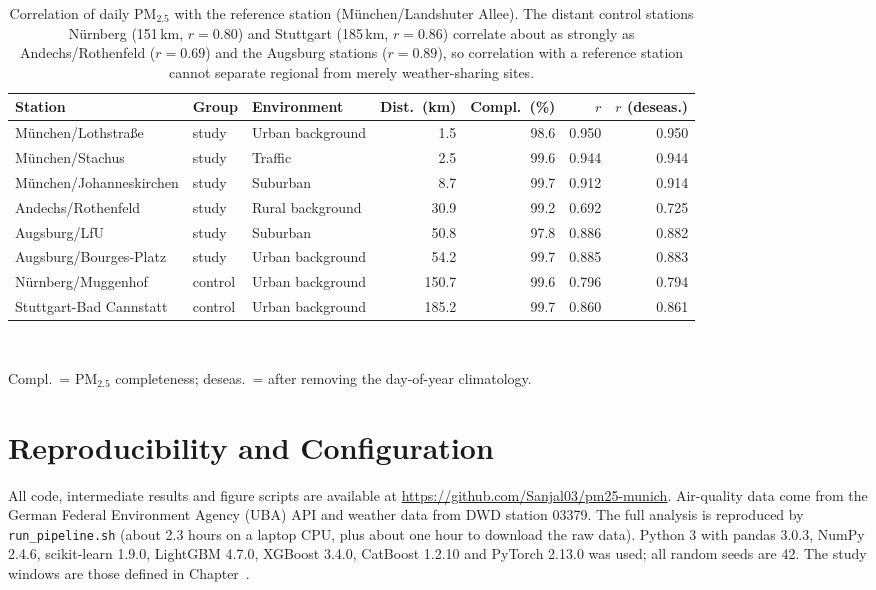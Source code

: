 \begin{table}[!htbp]
\centering\footnotesize\setlength{\tabcolsep}{4pt}
\caption{Correlation of daily PM$_{2.5}$ with the reference station (M\"unchen/Landshuter Allee). The distant control stations N\"urnberg (151\,km, $r=0.80$) and Stuttgart (185\,km, $r=0.86$) correlate about as strongly as Andechs/Rothenfeld ($r=0.69$) and the Augsburg stations ($r=0.89$), so correlation with a reference station cannot separate regional from merely weather-sharing sites.}
\label{tab:app-control}
\begin{tabular}{lllrrrr}
\toprule
Station & Group & Environment & Dist.\ (km) & Compl.\ (\%) & $r$ & $r$ (deseas.) \\
\midrule
M\"unchen/Lothstra{\ss}e & study & Urban background & 1.5 & 98.6 & 0.950 & 0.950 \\
M\"unchen/Stachus & study & Traffic & 2.5 & 99.6 & 0.944 & 0.944 \\
M\"unchen/Johanneskirchen & study & Suburban & 8.7 & 99.7 & 0.912 & 0.914 \\
Andechs/Rothenfeld & study & Rural background & 30.9 & 99.2 & 0.692 & 0.725 \\
Augsburg/LfU & study & Suburban & 50.8 & 97.8 & 0.886 & 0.882 \\
Augsburg/Bourges-Platz & study & Urban background & 54.2 & 99.7 & 0.885 & 0.883 \\
N\"urnberg/Muggenhof & control & Urban background & 150.7 & 99.6 & 0.796 & 0.794 \\
Stuttgart-Bad Cannstatt & control & Urban background & 185.2 & 99.7 & 0.860 & 0.861 \\
\bottomrule
\end{tabular}
\\[2pt]\parbox{0.92\textwidth}{\footnotesize Compl.\ = PM$_{2.5}$ completeness; deseas.\ = after removing the day-of-year climatology.}
\end{table}


\FloatBarrier
\section{Reproducibility and Configuration}
\label{app:repro}

All code, intermediate results and figure scripts are available at \url{https://github.com/Sanjal03/pm25-munich}. Air-quality data come from the German Federal Environment Agency (UBA) API and weather data from DWD station 03379. The full analysis is reproduced by \texttt{run\_pipeline.sh} (about 2.3 hours on a laptop CPU, plus about one hour to download the raw data). Python 3 with pandas 3.0.3, NumPy 2.4.6, scikit-learn 1.9.0, LightGBM 4.7.0, XGBoost 3.4.0, CatBoost 1.2.10 and PyTorch 2.13.0 was used; all random seeds are 42. The study windows are those defined in Chapter~.


